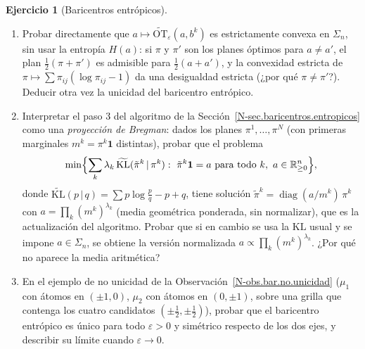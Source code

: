 \documentclass[11pt,a4paper]{amsart}
\newcounter{chapter}
\newcommand{\ve}{\varepsilon}
\newcommand{\R}{{\mathbb R}}
\theoremstyle{remark}
\theoremstyle{definition}
\newtheorem{ejercicio}{Ejercicio}[chapter]
\numberwithin{subsection}{section}
\numberwithin{equation}{section}
\begin{document}
\begin{ejercicio}[Baricentros entrópicos]\label{ejer.bar.entropico}
\leavevmode
\begin{enumerate}[label=(\alph*)]
\item Probar directamente que $a\mapsto\widetilde{\mathrm{OT}}_\ve(a,b^k)$ es
estrictamente convexa en $\Sigma_n$, sin usar la entropía $H(a)$:
si $\pi$ y $\pi'$ son los planes óptimos para $a\ne a'$, el plan
$\frac12(\pi+\pi')$ es admisible para $\frac12(a+a')$, y la convexidad
estricta de $\pi\mapsto\sum\pi_{ij}(\log\pi_{ij}-1)$ da una desigualdad
estricta (¿por qué $\pi\ne\pi'$?). Deducir otra vez la unicidad del
baricentro entrópico.
\item Interpretar el paso 3 del algoritmo de la
Sección~\ref{N-sec.baricentros.entropicos} como una \emph{proyección de
Bregman}: dados los planes $\pi^1,\dots,\pi^N$ (con primeras marginales
$m^k=\pi^k\mathbf 1$ distintas), probar que el problema
\[
\min\Bigl\{\sum_k\lambda_k\,\widetilde{\mathrm{KL}}(\tilde\pi^k\,|\,\pi^k):\ \tilde\pi^k\mathbf 1=a\ \text{para todo }k,\ a\in\R^n_{\ge0}\Bigr\},
\]
donde $\widetilde{\mathrm{KL}}(p\,|\,q)=\sum p\log\frac pq-p+q$,
tiene solución $\tilde\pi^k=\operatorname{diag}(a/m^k)\,\pi^k$ con
$a=\prod_k(m^k)^{\lambda_k}$ (media geométrica ponderada, sin normalizar),
que es la actualización del algoritmo. Probar que si en cambio se usa la
$\mathrm{KL}$ usual y se impone $a\in\Sigma_n$, se obtiene la versión
normalizada $a\propto\prod_k(m^k)^{\lambda_k}$. ¿Por qué no aparece la media
aritmética?
\item En el ejemplo de no unicidad de la Observación~\ref{N-obs.bar.no.unicidad}
($\mu_1$ con átomos en $(\pm1,0)$, $\mu_2$ con átomos en $(0,\pm1)$, sobre
una grilla que contenga los cuatro candidatos $(\pm\frac12,\pm\frac12)$),
probar que el baricentro entrópico es único para todo $\ve>0$ y simétrico
respecto de los dos ejes, y describir su límite cuando $\ve\to0$.
\end{enumerate}
\end{ejercicio}
\end{document}
